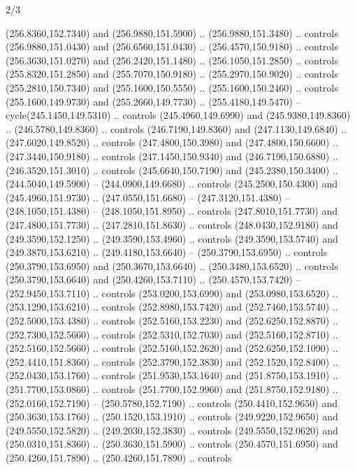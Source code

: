 \begin{flagdescription}{2/3}
\begin{scope}[xshift=0.5\flaglength,yshift=0.5\flagwidth,scale=\flagwidth/259.2]
\begin{scope}[y=0.8pt, x=0.8pt, yscale=-1,shift={(-243,-162)}]
      (256.8360,152.7340) and (256.9880,151.5900) .. (256.9880,151.3480) .. controls
      (256.9880,151.0430) and (256.6560,151.0430) .. (256.4570,150.9180) .. controls
      (256.3630,151.0270) and (256.2420,151.1480) .. (256.1050,151.2850) .. controls
      (255.8320,151.2850) and (255.7070,150.9180) .. (255.2970,150.9020) .. controls
      (255.2810,150.7340) and (255.1600,150.5550) .. (255.1600,150.2460) .. controls
      (255.1600,149.9730) and (255.2660,149.7730) .. (255.4180,149.5470) --
      cycle(245.1450,149.5310) .. controls (245.4960,149.6990) and
      (245.9380,149.8360) .. (246.5780,149.8360) .. controls (246.7190,149.8360) and
      (247.1130,149.6840) .. (247.6020,149.8520) .. controls (247.4800,150.3980) and
      (247.4800,150.6600) .. (247.3440,150.9180) .. controls (247.1450,150.9340) and
      (246.7190,150.6880) .. (246.3520,151.3010) .. controls (245.6640,150.7190) and
      (245.2380,150.3400) .. (244.5040,149.5900) -- (244.0900,149.6680) .. controls
      (245.2500,150.4300) and (245.4960,151.9730) .. (247.0550,151.6680) --
      (247.3120,151.4380) -- (248.1050,151.4380) -- (248.1050,151.8950) .. controls
      (247.8010,151.7730) and (247.4800,151.7730) .. (247.2810,151.8630) .. controls
      (248.0430,152.9180) and (249.3590,152.1250) .. (249.3590,153.4960) .. controls
      (249.3590,153.5740) and (249.3870,153.6210) .. (249.4180,153.6640) --
      (250.3790,153.6950) .. controls (250.3790,153.6950) and (250.3670,153.6640) ..
      (250.3480,153.6520) .. controls (250.3790,153.6640) and (250.4260,153.7110) ..
      (250.4570,153.7420) -- (252.9450,153.7110) .. controls (253.0200,153.6990) and
      (253.0980,153.6520) .. (253.1290,153.6210) .. controls (252.8980,153.7420) and
      (252.7460,153.5740) .. (252.5000,153.4380) .. controls (252.5160,153.2230) and
      (252.6250,152.8870) .. (252.7300,152.5660) .. controls (252.5310,152.7030) and
      (252.5160,152.8710) .. (252.5160,152.5660) .. controls (252.5160,152.2620) and
      (252.6250,152.1090) .. (252.4410,151.8360) .. controls (252.3790,152.3830) and
      (252.1520,152.8400) .. (252.0430,153.1760) .. controls (251.9530,153.1640) and
      (251.8750,153.1910) .. (251.7700,153.0860) .. controls (251.7700,152.9960) and
      (251.8750,152.9180) .. (252.0160,152.7190) -- (250.5780,152.7190) .. controls
      (250.4410,152.9650) and (250.3630,153.1760) .. (250.1520,153.1910) .. controls
      (249.9220,152.9650) and (249.5550,152.5820) .. (249.2030,152.3830) .. controls
      (249.5550,152.0620) and (250.0310,151.8360) .. (250.3630,151.5900) .. controls
      (250.4570,151.6950) and (250.4260,151.7890) .. (250.4260,151.7890) .. controls

\end{scope}
\end{scope}
\end{flagdescription}
